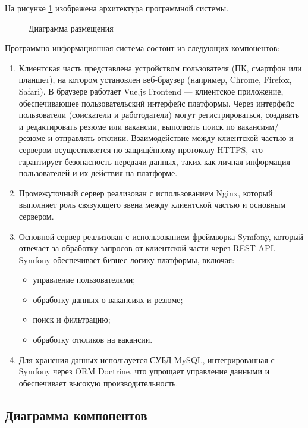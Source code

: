 На рисунке \ref{dc:image} изображена архитектура программной системы.

\begin{figure}[ht]
\center{\texttt{[image: dc]}}
\caption{Диаграмма размещения}
\label{dc:image}
\end{figure}

Программно-информационная система состоит из следующих компонентов:

\begin{enumerate}
	\item Клиентская часть представлена устройством пользователя (ПК, смартфон или планшет), на котором установлен веб-браузер (например, Chrome, Firefox, Safari). В браузере работает Vue.js Frontend — клиентское приложение, обеспечивающее пользовательский интерфейс платформы. Через интерфейс пользователи (соискатели и работодатели) могут регистрироваться, создавать и редактировать резюме или вакансии, выполнять поиск по вакансиям/резюме и отправлять отклики. Взаимодействие между клиентской частью и сервером осуществляется по защищённому протоколу HTTPS, что гарантирует безопасность передачи данных, таких как личная информация пользователей и их действия на платформе.
	\item Промежуточный сервер реализован с использованием Nginx, который выполняет роль связующего звена между клиентской частью и основным сервером.
	\item Основной сервер реализован с использованием фреймворка Symfony, который отвечает за обработку запросов от клиентской части через REST API. Symfony обеспечивает бизнес-логику платформы, включая:
	
	\begin{itemize}
		\item управление пользователями;
		\item обработку данных о вакансиях и резюме;
		\item поиск и фильтрацию;
		\item обработку откликов на вакансии.
	\end{itemize}
	
	\item Для хранения данных используется СУБД MySQL, интегрированная с Symfony через ORM Doctrine, что упрощает управление данными и обеспечивает высокую производительность.
\end{enumerate}

\subsection{Диаграмма компонентов}

